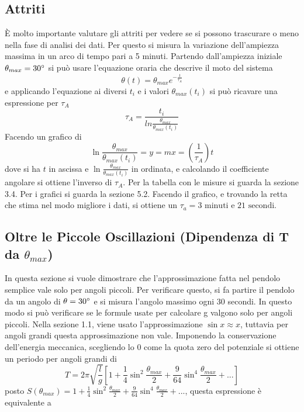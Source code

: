 \documentclass[a4paper]{article}
\begin{document}
\subsection{Attriti}
È molto importante valutare gli attriti per vedere se si possono trascurare o meno nella fase di analisi dei dati. Per questo si misura la variazione dell'ampiezza massima in un arco di tempo pari a 5 minuti. Partendo dall'ampiezza iniziale $\theta_{max} = 30\degree$ si può usare l'equazione oraria che descrive il moto del sistema
\begin{equation}
    \theta (t) = \theta_{max} e^{-\frac{t}{\tau_A}}
\end{equation}
e applicando l'equazione ai diversi $t_i$ e i valori $\theta_{max} (t_i)$ si può ricavare una espressione per $\tau_A$
\begin{equation}
    \tau_A = \frac{t_i}{ln{\frac{\theta_{max}}{\theta_{max} (t_i)}}}
\end{equation}
Facendo un grafico di 
\begin{equation}
    \ln{\frac{\theta_{max}}{\theta_{max}(t_i)}} = y = mx = (\frac{1}{\tau_A})t
\end{equation}
dove si ha $t$ in ascissa e $\ln{\frac{\theta_{max}}{\theta_{max}(t_i)}}$ in ordinata, e calcolando il coefficiente angolare si ottiene l'inverso di $\tau_A$. Per la tabella con le misure si guarda la sezione 3.4. Per i grafici si guarda la sezione 5.2. Facendo il grafico, e trovando la retta che stima nel modo migliore i dati, si ottiene un $\tau_a = 3 \text{ minuti e }  21 \text{ secondi}$. 

\subsection{Oltre le Piccole Oscillazioni (Dipendenza di T da $\theta_{max}$)}
In questa sezione si vuole dimostrare che l'approssimazione fatta nel pendolo semplice vale solo per angoli piccoli. Per verificare questo, si fa partire il pendolo da un angolo di $\theta = 30\degree$ e si misura l'angolo massimo ogni 30 secondi. In questo modo si può verificare se le formule usate per calcolare g valgono solo per angoli piccoli. Nella sezione 1.1, viene usato l'approssimazione $\sin x \approx x$, tuttavia per angoli grandi questa approssimazione non vale. Imponendo la conservazione dell'energia meccanica, scegliendo lo $0$ come la quota zero del potenziale si ottiene un periodo per angoli grandi di 
\begin{equation}
    T = 2\pi \sqrt{\frac{l}{g}} [1+\frac{1}{4}\sin^2 \frac{\theta_{max}}{2} + \frac{9}{64}\sin^4 \frac{\theta_{max}}{2}+...]
\end{equation}
posto $S(\theta_{max}) = 1+\frac{1}{4}\sin^2 \frac{\theta_{max}}{2} + \frac{9}{64}\sin^4 \frac{\theta_{max}}{2}+...$, questa espressione è equivalente a 
\end{document}
